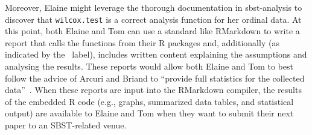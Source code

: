 Moreover, Elaine might leverage the thorough documentation in sbst-analysis to discover that {\tt wilcox.test} is a
correct analysis function for her ordinal data. At this point, both Elaine and Tom can use a standard like RMarkdown to
write a report that calls the functions from their R packages and, additionally (as indicated by the
\codeeditgit~label), includes written content explaining the assumptions and analysing the results. These reports would
allow both Elaine and Tom to best follow the advice of Arcuri and Briand to ``provide full statistics for the collected
data''~\cite{Arcuri2014}. When these reports are input into the RMarkdown compiler, the results of the embedded R code
(e.g., graphs, summarized data tables, and statistical output) are available to Elaine and Tom when they want to submit
their next paper to an SBST-related venue.


